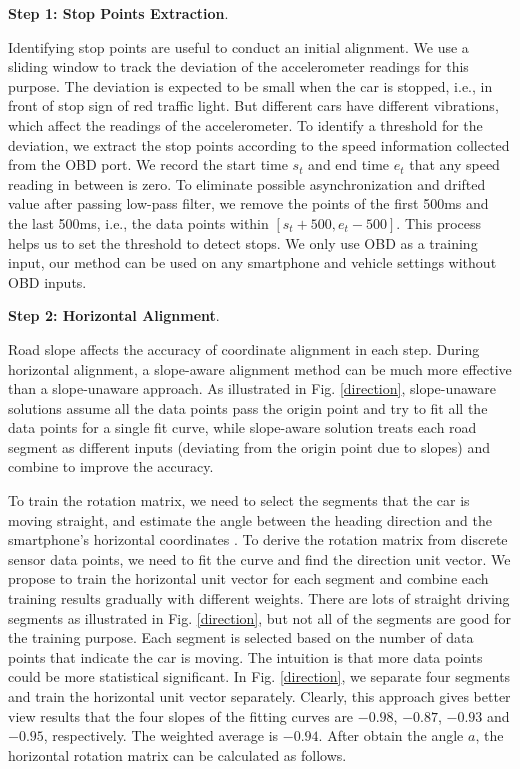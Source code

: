 \textbf{Step 1: Stop Points Extraction}. 

Identifying stop points are useful to conduct an initial alignment. 
We use a sliding window to track the deviation of the
accelerometer readings for this purpose.
The deviation is expected to be small when the car is stopped, 
i.e., in front of stop sign of red traffic light. 
But different cars have different vibrations, 
which affect the readings of the accelerometer. 
To identify a threshold for the deviation, 
we extract the stop points according to the speed information
collected from the OBD port.
We record the start time $s_t$ and end time $e_t$ that 
any speed reading in between is zero. 
To eliminate possible asynchronization and drifted value
after passing low-pass filter, 
we remove the points of the first 500ms and the last 500ms,
i.e., the data points within $[s_t + 500, e_t - 500]$. 
This process helps us to set the threshold to detect
stops. 
We only use OBD as a training input, 
our method can be used on any smartphone and vehicle settings
without OBD inputs. 
 

\textbf{Step 2: Horizontal Alignment}. 


Road slope affects the accuracy of coordinate alignment
in each step. 
During horizontal alignment, a slope-aware alignment method can
be much more effective than a slope-unaware approach. 
As illustrated in Fig. \ref{direction}, 
slope-unaware solutions assume all the data points 
pass the origin point and try to fit all the data
points for a single fit curve, 
while slope-aware solution treats each road segment
as different inputs (deviating from the origin point
due to slopes) and combine to improve the accuracy. 

To train the rotation matrix, we need to select the segments that the car is moving 
straight, and estimate the angle between the 
heading direction and the smartphone's horizontal coordinates \cite{wang2013sensing}.
To derive the rotation matrix from discrete sensor data points, 
we need to fit the curve and find the direction unit vector. 
We propose to train the horizontal
unit vector for each segment and combine each training results gradually with different weights.
There are lots of straight driving segments as illustrated in Fig. \ref{direction}, 
but not all of the segments are good for the training purpose. 
Each segment is selected based on the number of data points that
indicate the car is moving.
The intuition is that more data points could be more statistical significant. 
In Fig. \ref{direction}, we separate four segments and train the 
horizontal unit vector separately.
Clearly, this approach gives better view results that the four slopes of the 
fitting curves are $-0.98$, $-0.87$, $-0.93$ and $-0.95$, respectively. 
The weighted average is $-0.94$. 
After obtain the angle $a$, the horizontal 
rotation matrix can be calculated as follows. 

